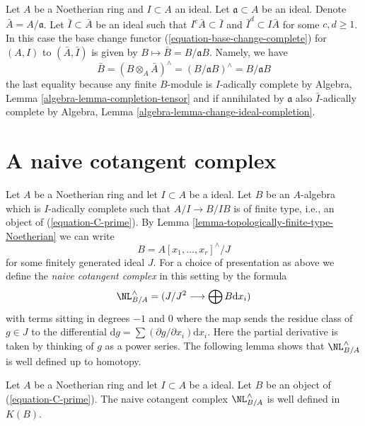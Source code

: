\begin{remark}
\label{remark-take-bar}
Let $A$ be a Noetherian ring and $I \subset A$ an ideal.
Let $\mathfrak a \subset A$ be an ideal. Denote $\bar A = A/\mathfrak a$.
Let $\bar I \subset \bar A$ be an ideal such that
$I^c \bar A \subset \bar I$ and $\bar I^d \subset I\bar A$
for some $c, d \geq 1$. In this case the base change functor
(\ref{equation-base-change-complete}) for $(A, I)$ to $(\bar A, \bar I)$
is given by $B \mapsto \bar B = B/\mathfrak aB$. Namely, we have
\begin{equation}
\label{equation-base-change-to-closed}
\bar B = (B \otimes_A \bar A)^\wedge = (B/\mathfrak a B)^\wedge =
B/\mathfrak a B
\end{equation}
the last equality because any finite $B$-module is $I$-adically complete by
Algebra, Lemma \ref{algebra-lemma-completion-tensor}
and if annihilated by $\mathfrak a$ also $\bar I$-adically complete by
Algebra, Lemma \ref{algebra-lemma-change-ideal-completion}.
\end{remark}







\section{A naive cotangent complex}
\label{section-naive-cotangent-complex}

\noindent
Let $A$ be a Noetherian ring and let $I \subset A$ be a ideal.
Let $B$ be an $A$-algebra which is $I$-adically complete such
that $A/I \to B/IB$ is of finite type, i.e., an object of
(\ref{equation-C-prime}).
By Lemma \ref{lemma-topologically-finite-type-Noetherian} we can write
$$
B = A[x_1, \ldots, x_r]^\wedge / J
$$
for some finitely generated ideal $J$. For a choice of presentation as
above we define the {\it naive cotangent complex}
in this setting by the formula
\begin{equation}
\label{equation-NL}
\NL_{B/A}^\wedge = (J/J^2 \longrightarrow \bigoplus B\text{d}x_i)
\end{equation}
with terms sitting in degrees $-1$ and $0$
where the map sends the residue class of $g \in J$ to the differential
$\text{d}g = \sum (\partial g/\partial x_i) \text{d}x_i$. Here
the partial derivative is taken by thinking of $g$ as a power series.
The following lemma shows that $\NL_{B/A}^\wedge$ is well defined
up to homotopy.

\begin{lemma}
\label{lemma-NL-up-to-homotopy}
Let $A$ be a Noetherian ring and let $I \subset A$ be a ideal.
Let $B$ be an object of (\ref{equation-C-prime}). The naive
cotangent complex $\NL_{B/A}^\wedge$ is well defined in $K(B)$.
\end{lemma}

